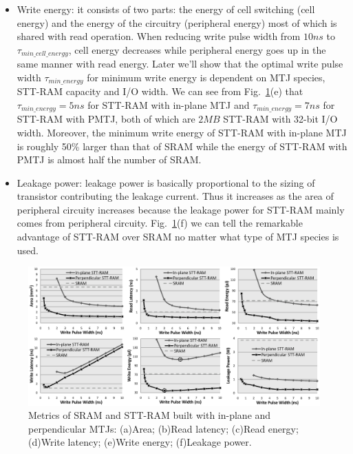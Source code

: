 \begin{itemize}
\item Write energy: it consists of two parts: the energy of cell switching (cell energy) and the energy of the circuitry (peripheral energy) most of which is shared with read operation. When reducing write pulse width from $10ns$ to $\tau_{min\_cell\_energy}$, cell energy decreases while peripheral energy goes up in the same manner with read energy. Later we'll show that the optimal write pulse width $\tau_{min\_energy}$ for minimum write energy is dependent on MTJ species, STT-RAM capacity and I/O width. We can see from Fig.~\ref{fig:metrics}(e) that $\tau_{min\_energy} = 5ns$ for STT-RAM with in-plane MTJ and $\tau_{min\_energy}= 7ns$ for STT-RAM with PMTJ, both of which are $2MB$ STT-RAM with 32-bit I/O width. Moreover, the minimum write energy of STT-RAM with in-plane MTJ is roughly 50\% larger than that of SRAM while the energy of STT-RAM with PMTJ is almost half the number of SRAM.
\item Leakage power: leakage power is basically proportional to the sizing of transistor contributing the leakage current. Thus it increases as the area of peripheral circuity increases because the leakage power for STT-RAM mainly comes from peripheral circuity. Fig.~\ref{fig:metrics}(f) we can tell the remarkable advantage of STT-RAM over SRAM no matter what type of MTJ species is used.
\end{itemize}


\begin{figure}[t]
  \centering
  \includegraphics[width=7in]{fig/AllMetrics.eps}
  \caption{Metrics of SRAM and STT-RAM built with in-plane and perpendicular MTJs: (a)Area; (b)Read latency; (c)Read energy; (d)Write latency; (e)Write energy; (f)Leakage power.}
  \label{fig:metrics}
\end{figure}

